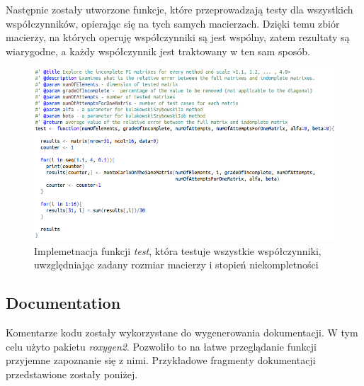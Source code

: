 Następnie zostały utworzone funkcje, które przeprowadzają testy dla wszystkich współczynników, opierając się na tych samych macierzach. Dzięki temu zbiór macierzy, na których operuję współczynniki są jest wspólny, zatem rezultaty są wiarygodne, a każdy współczynnik jest traktowany w ten sam sposób.

\begin{figure}[!ht]
\centerline{\includegraphics[scale=0.58]{images/kod22.png}}
\caption{Implemetnacja funkcji \textit{test}, która testuje wszystkie współczynniki, uwzględniając zadany rozmiar macierzy i stopień niekompletności}
\label{fig:rstudio}
\end{figure}


\subsection{Documentation}
Komentarze kodu zostały wykorzystane do wygenerowania dokumentacji. W tym celu użyto pakietu \textit{roxygen2}. Pozwoliło to na łatwe przeglądanie funkcji przyjemne zapoznanie się z nimi.
Przykładowe fragmenty dokumentacji przedstawione zostały poniżej.

